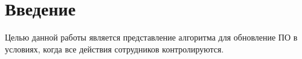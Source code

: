 \section*{Введение}

Целью данной работы является представление алгоритма для обновление ПО в условиях, когда все действия сотрудников контролируются.

